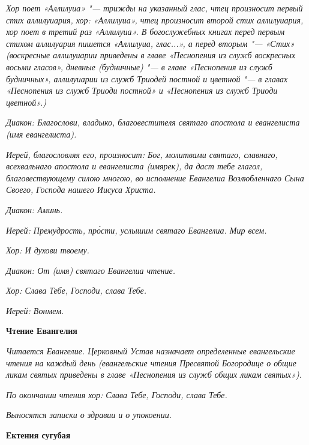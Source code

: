 \itshape Хор поет «Аллилуиа» "--- трижды на указанный глас, чтец произносит первый стих аллилуиария, хор: «Аллилуиа», чтец произносит второй стих аллилуиария, хор поет в третий раз «Аллилуиа». В богослужебных книгах перед первым стихом аллилуария пишется «Аллилуиа, глас...», а перед вторым "--- «Стих» (воскресные аллилуиарии приведены в главе «Песнопения из служб воскресных восьми гласов», дневные (будничные) "--- в главе «Песнопения из служб будничных», аллилуиарии из служб Триодей постной и цветной "--- в главах «Песнопения из служб Триоди постной» и «Песнопения из служб Триоди цветной».)\normalfont{}


\itshape Диакон:\normalfont{} Благослови, владыко, благовестителя святаго апостола и евангелиста \itshape (имя евангелиста)\normalfont{}.


\itshape Иерей, благословляя его, произносит:\normalfont{} Бог, молитвами святаго, славнаго, всехвальнаго апостола и евангелиста \itshape (имярек)\normalfont{}, да даст тебе глагол, благовествующему силою многою, во исполнение Евангелиа Возлюбленнаго Сына Своего, Господа нашего Иисуса Христа.


\itshape Диакон:\normalfont{} Аминь.


\itshape Иерей:\normalfont{} Премудрость, про́сти, услышим святаго Евангелиа. Мир всем.


\itshape Хор:\normalfont{} И духови твоему.


\itshape Диакон:\normalfont{} От \itshape (имя)\normalfont{} святаго Евангелиа чтение.


\itshape Хор\normalfont{}: Слава Тебе, Господи, слава Тебе.


\itshape Иерей:\normalfont{} Вонмем.





\bfseries Чтение Евангелия\normalfont{}


\itshape Читается Евангелие. Церковный Устав назначает определенные евангельские чтения на каждый день (евангельские чтения Пресвятой Богородице о общие ликам святых приведены в главе «Песнопения из служб общих ликам святых»).\normalfont{}


\itshape По окончании чтения хор:\normalfont{} Слава Тебе, Господи, слава Тебе.


\itshape Выносятся записки о здравии и о упокоении.\normalfont{}





\bfseries Ектения сугубая\normalfont{}


